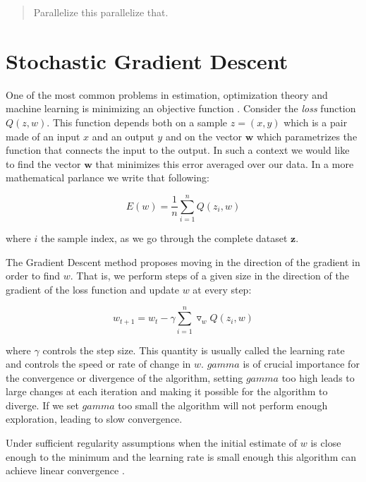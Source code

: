 \documentclass[11pt,a4paper]{article}
\newcommand{\Wb}{\mathbf{w}}
\begin{document}
\begin{abstract}
Parallelize this parallelize that.

\end{abstract}

\section{Stochastic Gradient Descent}


One of the most common problems in estimation, optimization theory and machine learning is
minimizing an objective function \citep{bottou2010large}. Consider the \textit{loss} function $Q(z,
w)$. This function depends both on a sample $z=(x, y)$ which is a pair made of an input $x$ and an
output $y$ and on the vector $\Wb$ which parametrizes the function that connects the input to the
output. In such a context we would like to find the vector $\Wb$ that minimizes this error averaged
over our data. In a more mathematical parlance we write that following:

\begin{equation}
E(w) = \frac{1}{n} \sum_{i=1}^n Q(z_i, w)
\end{equation}

where $i$ the sample index, as we go through the complete dataset $\mathbf{z}$.

The Gradient Descent method proposes moving in the direction of the gradient in order to
find $w$. That is, we perform steps of a given size in the direction of the gradient of the loss function and update $w$ at every step:

\begin{equation}
w_{t + 1} = w_t - \gamma \sum_{i=1}^n \triangledown_w Q(z_i, w)
\end{equation}

where $\gamma$ controls the step size. This quantity is usually called the learning rate and
controls the speed or rate of change in $w$. $gamma$ is of crucial importance for the
convergence or divergence of the algorithm, setting $gamma$ too high leads to large changes at each iteration and
making it possible for the algorithm to diverge. If we set $gamma$ too small the algorithm
will not perform enough exploration, leading to slow convergence.

Under sufficient regularity assumptions when the initial estimate of $w$ is close enough to the
minimum and the learning rate is small enough this algorithm can achieve linear convergence
\citep{dennis1996numerical}.
\end{document}
